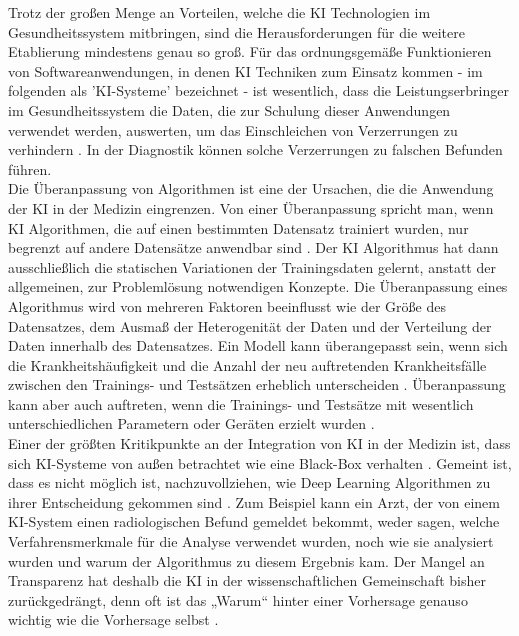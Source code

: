 Trotz der großen Menge an Vorteilen, welche die KI Technologien im Gesundheitssystem mitbringen, sind die Herausforderungen für die weitere Etablierung mindestens genau so groß. Für das ordnungsgemäße Funktionieren von Softwareanwendungen, in denen KI Techniken zum Einsatz kommen - im folgenden als 'KI-Systeme' bezeichnet - ist wesentlich, dass die Leistungserbringer im Gesundheitssystem die Daten, die zur Schulung dieser Anwendungen verwendet werden, auswerten, um das Einschleichen von Verzerrungen zu verhindern \cite{Chapter_14}. In der Diagnostik können solche Verzerrungen zu falschen Befunden führen.\\
Die Überanpassung von Algorithmen ist eine der Ursachen, die die Anwendung der KI in der Medizin eingrenzen. Von einer Überanpassung spricht man, wenn KI Algorithmen, die auf einen bestimmten Datensatz trainiert wurden, nur begrenzt auf andere Datensätze anwendbar sind \cite{AI_where_are_we_now}. Der KI Algorithmus hat dann ausschließlich die statischen Variationen der Trainingsdaten gelernt, anstatt der allgemeinen, zur Problemlösung notwendigen Konzepte. Die Überanpassung eines Algorithmus wird von mehreren Faktoren beeinflusst wie der Größe des Datensatzes, dem Ausmaß der Heterogenität der Daten und der Verteilung der Daten innerhalb des Datensatzes. Ein Modell kann überangepasst sein, wenn sich die Krankheitshäufigkeit und die Anzahl der neu auftretenden Krankheitsfälle zwischen den Trainings- und Testsätzen erheblich unterscheiden \cite{AI_where_are_we_now}. Überanpassung kann aber auch auftreten, wenn die Trainings- und Testsätze mit wesentlich unterschiedlichen Parametern oder Geräten erzielt wurden \cite{AI_where_are_we_now}.\\
Einer der größten Kritikpunkte an der Integration von KI in der Medizin ist, dass sich KI-Systeme von außen betrachtet wie eine Black-Box verhalten \cite{The_missing_pieces}. Gemeint ist, dass es nicht möglich ist, nachzuvollziehen, wie Deep Learning Algorithmen zu ihrer Entscheidung gekommen sind \cite{The_missing_pieces}. Zum Beispiel kann ein Arzt, der von einem KI-System einen radiologischen Befund gemeldet bekommt, weder sagen, welche Verfahrensmerkmale für die Analyse verwendet wurden, noch wie sie analysiert wurden und warum der Algorithmus zu diesem Ergebnis kam\cite{The_missing_pieces}. Der Mangel an Transparenz hat deshalb die KI in der wissenschaftlichen Gemeinschaft bisher zurückgedrängt, denn oft ist das „Warum“ hinter einer Vorhersage genauso wichtig wie die Vorhersage selbst \cite{The_missing_pieces}.\\
